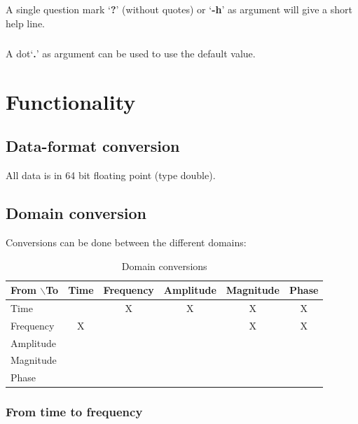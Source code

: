\documentclass{report}
\newcommand{\bs}{$\backslash$}
\begin{document}
\paragraph{}
A single question mark `\textbf{?}' (without quotes) or
`\textbf{-h}' as argument will give a short help line.

\paragraph{}
A dot`\textbf{.}' as argument can be used to use the default value.

\chapter{Functionality}

\section{Data-format conversion} 

All data is in 64 bit floating point (type double).

\section{Domain conversion}

Conversions can be done between the different domains:

\begin{table}[h]
\begin{center}
\begin{tabular}{|l|c|c|c|c|c|}
\hline
From \bs To  &  Time & Frequency & Amplitude & Magnitude &   Phase \\
\hline
Time      &       &     X     &     X     &     X     &     X \\
\hline
Frequency &   X   &           &           &     X     &     X \\
\hline
Amplitude & & & & & \\
\hline
Magnitude & & & & & \\
\hline
Phase     & & & & & \\
\hline
\end{tabular}
\label{tab:conversions}
\caption{Domain conversions}
\end{center}
\end{table}

\subsection{From time to frequency}
\end{document}
